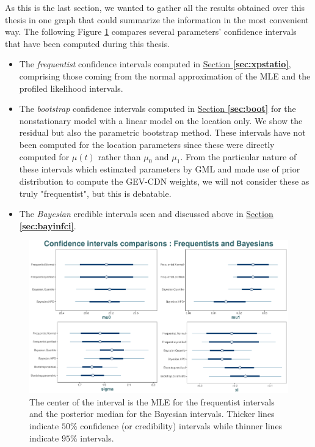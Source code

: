 As this is the last section, we wanted to gather all the results obtained over this thesis in one graph that could summarize the information in the most convenient way.
The following Figure \ref{fig:cicomp} compares several parameters' confidence intervals that have been computed during this thesis. 

\begin{itemize}
	\item The \emph{frequentist} confidence intervals computed in
	\hyperref[sec:xpstatio]{Section \textbf{\ref{sec:xpstatio}}}, comprising those coming from the normal approximation of the MLE and the profiled likelihood intervals.
	\item The \emph{bootstrap} confidence intervals computed in  \hyperref[sec:boot]{Section \textbf{\ref{sec:boot}}} for the nonstationary model with  a linear model on the location only. We show the residual but also the parametric bootstrap method. These intervals have not been computed for the location parameters since these were directly computed for $\mu(t)$ rather than $\mu_0$ and $\mu_1$. From the particular nature of these intervals which estimated parameters by GML and made use of prior distribution to compute the GEV-CDN weights, we will not consider these as truly "frequentist", but this is debatable.
	\item The \emph{Bayesian} credible intervals seen and discussed above in \hyperref[sec:bayinfci]{Section \textbf{\ref{sec:bayinfci}}}.
\end{itemize}

\begin{figure}[!htb]
	\centering	\includegraphics[width=0.9\linewidth]{cicomp.pdf}\caption{The center of the interval is the MLE for the frequentist intervals and the posterior median for the Bayesian intervals. Thicker lines indicate $50\%$ confidence (or credibility) intervals while thinner lines indicate $95\%$ intervals.}\label{fig:cicomp}
\end{figure}

